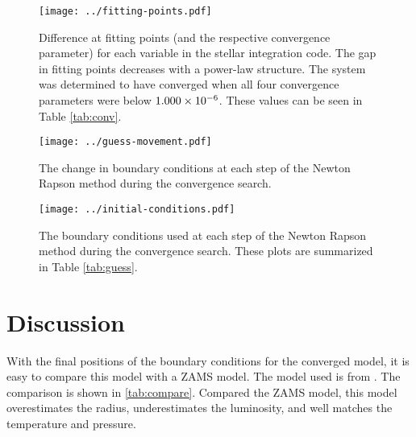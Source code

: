 \documentclass[10pt]{article}
\begin{document}
\begin{table}[htbp]
\begin{center}
\label{tab:conv}

 \end{center}
 \end{table}
 
 \begin{figure}[htbp]
    \centering
    \texttt{[image: ../fitting-points.pdf]}
    \caption[Gaps at Fitting Points]{Difference at fitting points (and the respective convergence parameter) for each variable in the stellar integration code. The gap in fitting points decreases with a power-law structure. The system was determined to have converged when all four convergence parameters were below $1.000 \times 10^{-6}$. These values can be seen in Table \ref{tab:conv}.}
    \label{fig:conv}
 \end{figure}
 
  \begin{figure}[htbp]
    \centering
    \texttt{[image: ../guess-movement.pdf]}
    \caption[Boundary Point Movement]{The change in boundary conditions at each step of the Newton Rapson method during the convergence search.}
    \label{fig:boundarydelta}
 \end{figure}
 \begin{figure}[htbp]
    \centering
    \texttt{[image: ../initial-conditions.pdf]}
    \caption[Boundary Points]{The boundary conditions used at each step of the Newton Rapson method during the convergence search. These plots are summarized in Table \ref{tab:guess}.}
    \label{fig:boundary}
 \end{figure}    


\section{Discussion} \label{sec:discussion}
With the final positions of the boundary conditions for the converged model, it is easy to compare this model with a ZAMS model. The model used is from \citet{hansen2004stellar}. The comparison is shown in \cref{tab:compare}. Compared the ZAMS model, this model overestimates the radius, underestimates the luminosity, and well matches the temperature and pressure.
\end{document}
